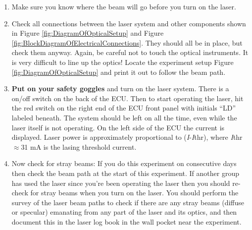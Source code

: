 \documentclass{../lab}
\begin{document}
\begin{enumerate}
\begin{itemize}
\begin{itemize}
            \item Scan knob: Turn all the way to the right.
    
            \item Offset knob: Turn 8 turns to the right, and then an additional 45 degrees (approximately) to the right.
        \end{itemize}

\newpage

        \item After you have made the adjustments, you should see a faint glow in the glass Rb chamber using the Blue Night Vision Viewer (press the red button while looking through the Viewer, and adjust to the focus to see clearly). If you do not see a glow using the Viewer, trying adjusting the Offset knob slightly either way until you see it. Be careful not to turn the knob too far, for this will throw off your other measurements.
    \end{itemize}
    
    \item Make sure you know where the beam will go before you turn on the laser.

    \item Check all connections between the laser system and other components shown in Figure \ref{fig:DiagramOfOpticalSetup} and Figure \ref{fig:BlockDiagramOfElectricalConnections}. They should all be in place, but check them anyway. Again, be careful not to touch the optical instruments. It is very difficult to line up the optics! Locate the experiment setup Figure \ref{fig:DiagramOfOpticalSetup} and print it out to follow the beam path.
    
    \item \textbf{Put on your safety goggles} and turn on the laser system. There is a on/off switch on the back of the ECU. Then to start operating the laser, hit the red switch on the right end of the ECU front panel with initials ``LD'' labeled beneath. The system should be left on all the time, even while the laser itself is not operating. On the left side of the ECU the current is displayed. Laser power is approximately proportional to (\emph{I}-\emph{I}thr), where \emph{I}thr$\approx$31 mA is the lasing threshold current.
    
    \item Now check for stray beams: If you do this experiment on consecutive days then check the beam path at the start of this experiment. If another group has used the laser since you're been operating the laser then you should re-check for stray beams when you turn on the laser. You should perform the survey of the laser beam paths to check if there are any stray beams (diffuse or specular) emanating from any part of the laser and its optics, and then document this in the laser log book in the wall pocket near the experiment.
    

\end{enumerate}
\end{document}
